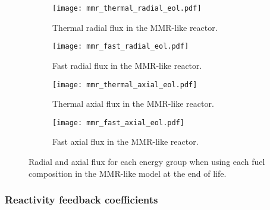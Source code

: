    
\begin{figure}
        \centering
        \begin{subfigure}[b]{0.48\textwidth}
            \centering
            \texttt{[image: mmr\_thermal\_radial\_eol.pdf]}
            \caption{Thermal radial flux in the \gls{MMR}-like reactor.}
            \label{fig:mmr_thermal_radial_eol}
        \end{subfigure}
        \hfill
        \begin{subfigure}[b]{0.48\textwidth}
            \centering
            \texttt{[image: mmr\_fast\_radial\_eol.pdf]}
            \caption{Fast radial flux in the \gls{MMR}-like reactor.}
            \label{fig:mmr_fast_radial_eol}
        \end{subfigure}
        \hfill
            
        \begin{subfigure}[b]{0.48\textwidth}
            \centering
            \texttt{[image: mmr\_thermal\_axial\_eol.pdf]}
            \caption{Thermal axial flux in the \gls{MMR}-like reactor. }
            \label{fig:mmr_thermal_axial_eol}
        \end{subfigure}
        \hfill
        \begin{subfigure}[b]{0.48\textwidth}
            \centering
            \texttt{[image: mmr\_fast\_axial\_eol.pdf]}
            \caption{Fast axial flux in the \gls{MMR}-like reactor.}
            \label{fig:mmr_fast_axial_eol}
        \end{subfigure}
        \hfill
        \caption{Radial and axial flux for each energy group when using 
        each fuel composition in the \gls{MMR}-like model at the end 
        of life.}
        \label{fig:mmr_eol}
   \end{figure}


\subsubsection{Reactivity feedback coefficients}

